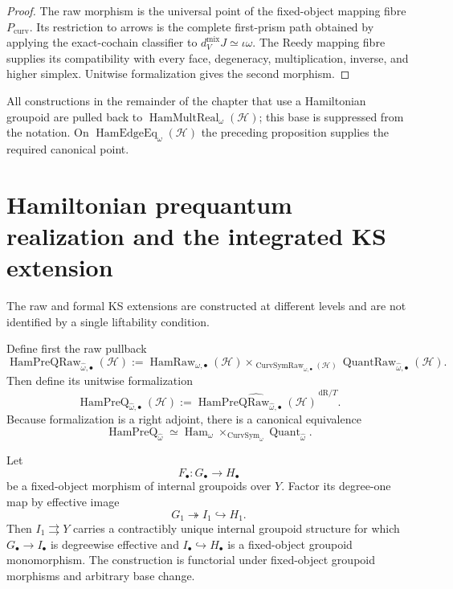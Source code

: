 \begin{proof}
The raw morphism is the universal point of the fixed-object mapping fibre
$P_{\mathrm{curv}}$.  Its restriction to arrows is the complete first-prism
path obtained by applying the exact-cochain classifier to
$d_V^{\mathrm{mix}}J\simeq\iota\omega$.  The Reedy mapping fibre supplies its
compatibility with every face, degeneracy, multiplication, inverse, and higher
simplex.  Unitwise formalization gives the second morphism.
\end{proof}

All constructions in the remainder of the chapter that use a Hamiltonian
groupoid are pulled back to
$\operatorname{HamMultReal}_{\omega}(\mathcal H)$; this base is suppressed from
the notation.  On $\operatorname{HamEdgeEq}_{\omega}(\mathcal H)$ the preceding
proposition supplies the required canonical point.

\section{Hamiltonian prequantum realization and the integrated KS extension}
\label{sec:prequantum-integrated-kostant-souriau}

The raw and formal KS extensions are constructed at different levels and are not
identified by a single liftability condition.

\begin{definition}
\label{def:prequantum-hamiltonian-prequantum-lift-realization}
Define first the raw pullback
\[
\boxed{
\operatorname{HamPreQRaw}_{\widehat\omega,\bullet}(\mathcal H)
:=
\operatorname{HamRaw}_{\omega,\bullet}(\mathcal H)
\times_{\operatorname{CurvSymRaw}_{\omega,\bullet}(\mathcal H)}
\operatorname{QuantRaw}_{\widehat\omega,\bullet}(\mathcal H).
}
\]
Then define its unitwise formalization
\[
\boxed{
\operatorname{HamPreQ}_{\widehat\omega,\bullet}(\mathcal H)
:=
\widehat{\operatorname{HamPreQRaw}_{\widehat\omega,\bullet}(\mathcal H)}^{\,\mathrm{dR}/T}.
}
\]
Because formalization is a right adjoint, there is a canonical equivalence
\[
\operatorname{HamPreQ}_{\widehat\omega}
\simeq
\operatorname{Ham}_{\omega}
\times_{\operatorname{CurvSym}_{\omega}}
\operatorname{Quant}_{\widehat\omega}.
\]
\end{definition}

\begin{theorem}
\label{thm:prequantum-effective-image-subgroupoid}
Let
\[
F_\bullet:G_\bullet\longrightarrow H_\bullet
\]
be a fixed-object morphism of internal groupoids over $Y$.  Factor its degree-one
map by effective image
\[
G_1\twoheadrightarrow I_1\hookrightarrow H_1.
\]
Then $I_1\rightrightarrows Y$ carries a contractibly unique internal groupoid
structure for which $G_\bullet\to I_\bullet$ is degreewise effective and
$I_\bullet\hookrightarrow H_\bullet$ is a fixed-object groupoid monomorphism.
The construction is functorial under fixed-object groupoid morphisms and
arbitrary base change.
\end{theorem}

